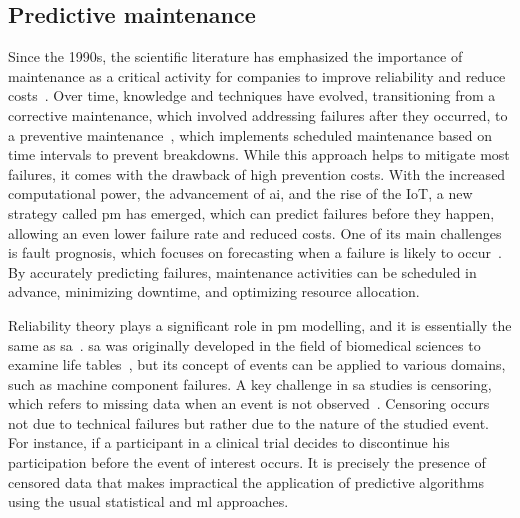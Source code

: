     \subsection{Predictive maintenance}

Since the 1990s, the scientific literature has emphasized the importance of maintenance as a critical activity for companies to improve reliability and reduce costs~\cite{Cho1991, Reinertsen1996}. Over time, knowledge and techniques have evolved, transitioning from a corrective maintenance, which involved addressing failures after they occurred, to a preventive maintenance~\cite{Ran2019}, which implements scheduled maintenance based on time intervals to prevent breakdowns. While this approach helps to mitigate most failures, it comes with the drawback of high prevention costs. With the increased computational power, the advancement of \ac{ai}, and the rise of the IoT, a new strategy called \ac{pm} has emerged, which can predict failures before they happen, allowing an even lower failure rate and reduced costs. One of its main challenges is fault prognosis, which focuses on forecasting when a failure is likely to occur~\cite{Wang2017_paradigm}. By accurately predicting failures, maintenance activities can be scheduled in advance, minimizing downtime, and optimizing resource allocation.

Reliability theory plays a significant role in \ac{pm} modelling, and it is essentially the same as \ac{sa}~\cite{Yang2022_prognostic}. \ac{sa} was originally developed in the field of biomedical sciences to examine life tables~\cite{Cox1972}, but its concept of events can be applied to various domains, such as machine component failures. A key challenge in \ac{sa} studies is censoring, which refers to missing data when an event is not observed~\cite{Leung1997, Gijbels2010}. Censoring occurs not due to technical failures but rather due to the nature of the studied event. For instance, if a participant in a clinical trial decides to discontinue his participation before the event of interest occurs. It is precisely the presence of censored data that makes impractical the application of predictive algorithms using the usual statistical and \ac{ml} approaches.

